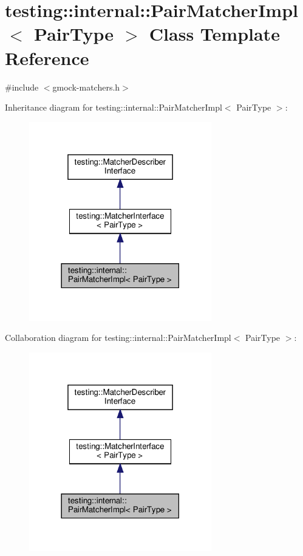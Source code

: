 \hypertarget{classtesting_1_1internal_1_1_pair_matcher_impl}{}\section{testing\+:\+:internal\+:\+:Pair\+Matcher\+Impl$<$ Pair\+Type $>$ Class Template Reference}
\label{classtesting_1_1internal_1_1_pair_matcher_impl}


{\ttfamily \#include $<$gmock-\/matchers.\+h$>$}



Inheritance diagram for testing\+:\+:internal\+:\+:Pair\+Matcher\+Impl$<$ Pair\+Type $>$\+:
\nopagebreak
\begin{figure}[H]
\begin{center}
\leavevmode
\includegraphics[width=225pt]{classtesting_1_1internal_1_1_pair_matcher_impl__inherit__graph}
\end{center}
\end{figure}


Collaboration diagram for testing\+:\+:internal\+:\+:Pair\+Matcher\+Impl$<$ Pair\+Type $>$\+:
\nopagebreak
\begin{figure}[H]
\begin{center}
\leavevmode
\includegraphics[width=225pt]{classtesting_1_1internal_1_1_pair_matcher_impl__coll__graph}
\end{center}
\end{figure}
